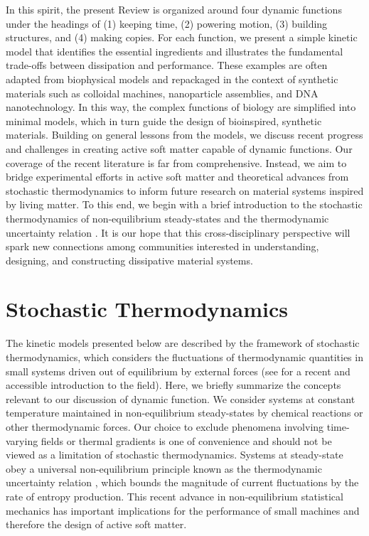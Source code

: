 \begin{appendices}
In this spirit, the present Review is organized around four dynamic functions under the headings of (1) keeping time, (2) powering motion, (3) building structures, and (4) making copies. For each function, we present a simple kinetic model that identifies the essential ingredients and illustrates the fundamental trade-offs between dissipation and performance. These examples are often adapted from biophysical models and repackaged in the context of synthetic materials such as colloidal machines, nanoparticle assemblies, and DNA nanotechnology. In this way, the complex functions of biology are simplified into minimal models, which in turn guide the design of bioinspired, synthetic materials. Building on general lessons from the models, we discuss recent progress and challenges in creating active soft matter capable of dynamic functions. Our coverage of the recent literature is far from comprehensive. Instead, we aim to bridge experimental efforts in active soft matter and theoretical advances from stochastic thermodynamics to inform future research on material systems inspired by living matter. To this end, we begin with a brief introduction to the stochastic thermodynamics of non-equilibrium steady-states and the thermodynamic uncertainty relation  \cite{Barato2015, Gingrich2016, Pietzonka2016b}. It is our hope that this cross-disciplinary perspective will spark new connections among communities interested in understanding, designing, and constructing dissipative material systems.

\section{Stochastic Thermodynamics}

The kinetic models presented below are described by the framework of stochastic thermodynamics, which considers the fluctuations of thermodynamic quantities in small systems driven out of equilibrium by external forces \cite{Seifert2012, VanDenBroeck2015, Ciliberto2017} (see \cite{Seifert2018} for a recent and accessible introduction to the field).  Here, we briefly summarize the concepts relevant to our discussion of dynamic function. We consider systems at constant temperature maintained in non-equilibrium steady-states by chemical reactions or other thermodynamic forces.  Our choice to exclude phenomena involving time-varying fields \cite{Barato2016,Barato2017b} or thermal gradients \cite{Pietzonka2018} is one of convenience and should not be viewed as a limitation of stochastic thermodynamics.  Systems at steady-state obey a universal non-equilibrium principle known as the thermodynamic uncertainty relation \cite{Barato2015, Gingrich2016, Pietzonka2016b}, which bounds the magnitude of current fluctuations by the rate of entropy production.  This recent advance in non-equilibrium statistical mechanics has important implications for the performance of small machines and therefore the design of active soft matter.


\end{appendices}
